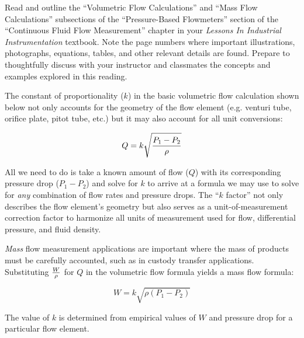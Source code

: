 

Read and outline the ``Volumetric Flow Calculations'' and ``Mass Flow Calculations'' subsections of the ``Pressure-Based Flowmeters'' section of the ``Continuous Fluid Flow Measurement'' chapter in your {\it Lessons In Industrial Instrumentation} textbook.  Note the page numbers where important illustrations, photographs, equations, tables, and other relevant details are found.  Prepare to thoughtfully discuss with your instructor and classmates the concepts and examples explored in this reading.















The constant of proportionality ($k$) in the basic volumetric flow calculation shown below not only accounts for the geometry of the flow element (e.g. venturi tube, orifice plate, pitot tube, etc.) but it may also account for all unit conversions:

$$Q = k \sqrt{{P_1 - P_2} \over \rho}$$

All we need to do is take a known amount of flow ($Q$) with its corresponding pressure drop ($P_1 - P_2$) and solve for $k$ to arrive at a formula we may use to solve for {\it any} combination of flow rates and pressure drops.  The ``$k$ factor'' not only describes the flow element's geometry but also serves as a unit-of-measurement correction factor to harmonize all units of measurement used for flow, differential pressure, and fluid density.

\vskip 10pt

{\it Mass} flow measurement applications are important where the mass of products must be carefully accounted, such as in custody transfer applications.  Substituting $W \over \rho$ for $Q$ in the volumetric flow formula yields a mass flow formula:

$$W = k \sqrt{\rho ({P_1 - P_2})}$$

The value of $k$ is determined from empirical values of $W$ and pressure drop for a particular flow element.







